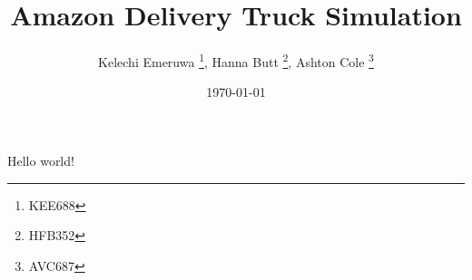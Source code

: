 \documentclass[letterpaper]{article}
\title{Amazon Delivery Truck Simulation}
\author{Kelechi Emeruwa \thanks{KEE688}, Hanna Butt \thanks{HFB352}, Ashton Cole \thanks{AVC687}}
\date{\today}
\begin{document}
    \maketitle
    Hello world!
\end{document}
